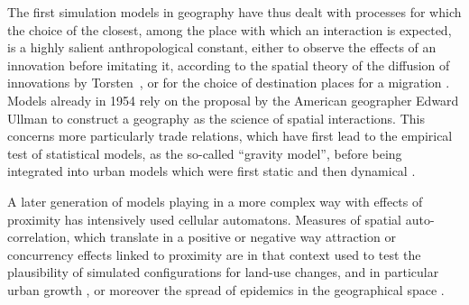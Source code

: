 \documentclass[10pt]{article}
\begin{document}
The first simulation models in geography have thus dealt with processes for which the choice of the closest, among the place with which an interaction is expected, is a highly salient anthropological constant, either to observe the effects of an innovation before imitating it, according to the spatial theory of the diffusion of innovations by Torsten~\cite{}, or for the choice of destination places for a migration \citep{}. Models already in 1954 rely on the proposal by the American geographer Edward Ullman to construct a geography as the science of spatial interactions. This concerns more particularly trade relations, which have first lead to the empirical test of statistical models, as the so-called ``gravity model'', before being integrated into urban models which were first static \citep{} and then dynamical \citep{}.


A later generation of models playing in a more complex way with effects of proximity has intensively used cellular automatons. Measures of spatial auto-correlation, which translate in a positive or negative way attraction or concurrency effects linked to proximity are in that context used to test the plausibility of simulated configurations for land-use changes, and in particular urban growth \citep{}, or moreover the spread of epidemics in the geographical space \citep{cliff2004world}.
\end{document}

